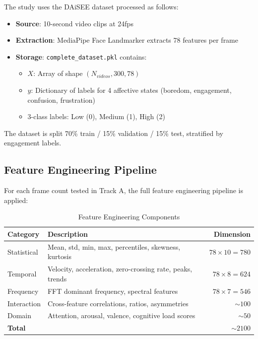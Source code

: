 \documentclass[11pt,a4paper]{article}
\begin{document}
The study uses the DAiSEE dataset processed as follows:

\begin{itemize}
    \item \textbf{Source}: 10-second video clips at 24fps
    \item \textbf{Extraction}: MediaPipe Face Landmarker extracts 78 features per frame
    \item \textbf{Storage}: \texttt{complete\_dataset.pkl} contains:
    \begin{itemize}
        \item $X$: Array of shape $(N_{videos}, 300, 78)$
        \item $y$: Dictionary of labels for 4 affective states (boredom, engagement, confusion, frustration)
        \item 3-class labels: Low (0), Medium (1), High (2)
    \end{itemize}
\end{itemize}

The dataset is split 70\% train / 15\% validation / 15\% test, stratified by engagement labels.

\subsection{Feature Engineering Pipeline}

For each frame count tested in Track A, the full feature engineering pipeline is applied:

\begin{table}[H]
\centering
\caption{Feature Engineering Components}
\label{tab:feature-engineering}
\begin{tabular}{@{}llr@{}}
\toprule
\textbf{Category} & \textbf{Description} & \textbf{Dimension} \\
\midrule
Statistical & Mean, std, min, max, percentiles, skewness, kurtosis & $78 \times 10 = 780$ \\
Temporal & Velocity, acceleration, zero-crossing rate, peaks, trends & $78 \times 8 = 624$ \\
Frequency & FFT dominant frequency, spectral features & $78 \times 7 = 546$ \\
Interaction & Cross-feature correlations, ratios, asymmetries & $\sim 100$ \\
Domain & Attention, arousal, valence, cognitive load scores & $\sim 50$ \\
\midrule
\textbf{Total} & & $\sim 2100$ \\
\bottomrule
\end{tabular}
\end{table}
\end{document}
